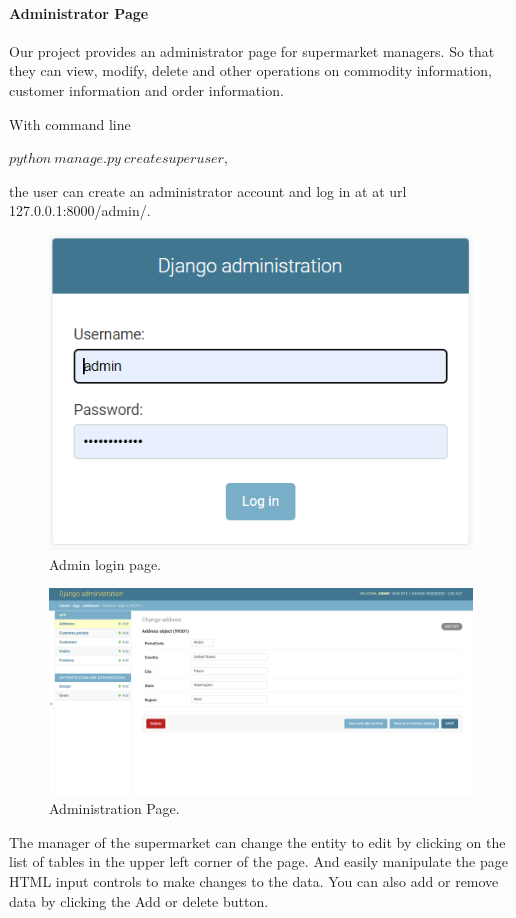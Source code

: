 \paragraph{Administrator Page}
Our project provides an administrator page for supermarket managers.  So that they can view, modify, delete and other operations on commodity information, customer information and order information. \par
With command line \par
$python \ manage.py \ createsuperuser$,\par
the user can create an administrator account and log in at at url 127.0.0.1:8000/admin/.  
\begin{figure}[H]
    \centering
    \includegraphics[width=\columnwidth/2]{images/login.png}
    \caption[Short text]{Admin login page.}
    \label{fig:ER}
\end{figure}
\begin{figure}[H]
    \centering
    \includegraphics[width=\columnwidth]{images/admin.png}
    \caption[Short text]{Administration Page.}
    \label{fig:ER}
\end{figure}
The manager of the supermarket can change the entity to edit by clicking on the list of tables in the upper left corner of the page.  And easily manipulate the page HTML input controls to make changes to the data.  You can also add or remove data by clicking the Add or delete button.  
